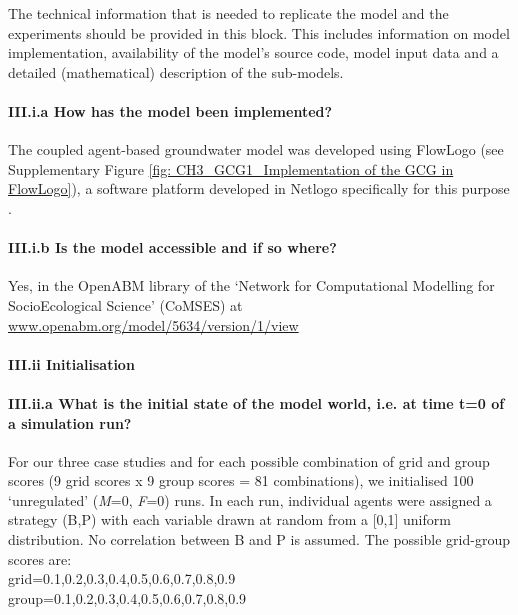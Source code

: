 \documentclass[12pt, a4paper]{article}
\begin{document}
The technical information that is needed to replicate the model and the experiments should be provided in this block. This includes information on model implementation, availability of the model's source code, model input data and a detailed (mathematical) description of the sub-models.

\paragraph{III.i.a How has the model been implemented?}

The coupled agent-based groundwater model was developed using FlowLogo \autocite{CastillaRho:2015dr} (see Supplementary Figure \ref{fig: CH3_GCG1_Implementation of the GCG in FlowLogo}), a software platform developed in Netlogo specifically for this purpose \autocite{CastillaRho:2015dr}.

\paragraph{III.i.b Is the model accessible and if so where?}

Yes, in the OpenABM library of the `Network for Computational Modelling for SocioEcological Science' (CoMSES) at \url{www.openabm.org/model/5634/version/1/view}

\paragraph{III.ii Initialisation}

\paragraph{III.ii.a What is the initial state of the model world, i.e. at time t=0 of a simulation run?}

For our three case studies and for each possible combination of grid and group scores (9 grid scores x 9 group scores = 81 combinations), we initialised 100 `unregulated' (\emph{M}=0, \emph{F}=0) runs. In each run, individual agents were assigned a strategy (B,P) with each variable drawn at random from a [0,1] uniform distribution. No correlation between B and P is assumed. The possible grid-group scores are:\\

grid=0.1,0.2,0.3,0.4,0.5,0.6,0.7,0.8,0.9\\

group=0.1,0.2,0.3,0.4,0.5,0.6,0.7,0.8,0.9\\
\end{document}
